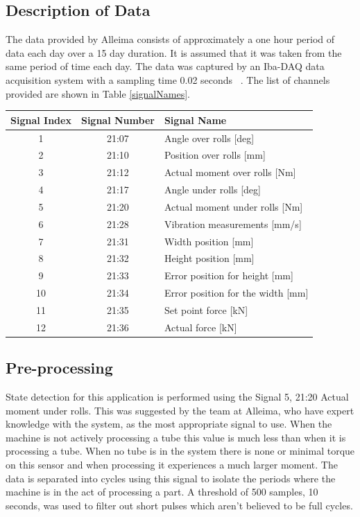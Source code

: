 \documentclass[]{article}
\begin{document}
\subsection{Description of Data}
The data provided by Alleima consists of approximately a one hour period of data each day over a 15 day duration. It is assumed that it was taken from the same period of time each day. The data was captured by an Iba-DAQ data acquisition system with a sampling time 0.02 seconds ~\cite{ibaMDAQ}. The list of channels provided are shown in Table \ref{signalNames}.
\begin{center}
\label{signalNames}
\begin{tabular}{ |c|c|l| }
 \hline
Signal Index & Signal Number & Signal Name \\ 
 \hline
1 & 21:07 & Angle over rolls [deg] \\
 \hline
2 & 21:10 & Position over rolls [mm] \\
 \hline
3 & 21:12 & Actual moment over rolls [Nm] \\
 \hline
4 & 21:17 & Angle under rolls [deg] \\
 \hline
5 & 21:20 & Actual moment under rolls [Nm] \\
 \hline
6 & 21:28 & Vibration measurements [mm/s] \\ 
 \hline              
7 & 21:31 & Width position [mm] \\
 \hline
8 & 21:32 & Height position [mm] \\
 \hline
9 & 21:33 & Error position for height [mm] \\
 \hline
10 & 21:34 & Error position for the width [mm] \\
 \hline
11 & 21:35 & Set point force [kN] \\
 \hline
12 & 21:36 & Actual force [kN] \\
 \hline
\end{tabular}
\end{center}

\subsection{Pre-processing}
State detection for this application is performed using the Signal 5, 21:20 Actual moment under rolls. This was suggested by the team at Alleima, who have expert knowledge with the system, as the most appropriate signal to use. When the machine is not actively processing a tube this value is much less than when it is processing a tube. When no tube is in the system there is none or minimal torque on this sensor and when processing it experiences a much larger moment. The data is separated into cycles using this signal to isolate the periods where the machine is in the act of processing a part. A threshold of 500 samples, 10 seconds, was used to filter out short pulses which aren't believed to be full cycles.
\end{document}
